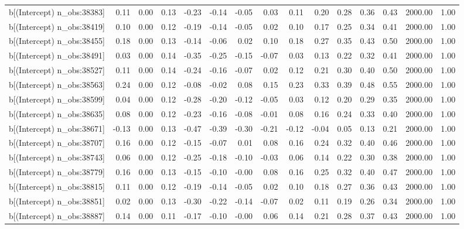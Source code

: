 \begin{table}[ht]
\begin{tabular}{rrrrrrrrrrrrrrr}
  b[(Intercept) n\_obs:38383] & 0.11 & 0.00 & 0.13 & -0.23 & -0.14 & -0.05 & 0.03 & 0.11 & 0.20 & 0.28 & 0.36 & 0.43 & 2000.00 & 1.00 \\ 
  b[(Intercept) n\_obs:38419] & 0.10 & 0.00 & 0.12 & -0.19 & -0.14 & -0.05 & 0.02 & 0.10 & 0.17 & 0.25 & 0.34 & 0.41 & 2000.00 & 1.00 \\ 
  b[(Intercept) n\_obs:38455] & 0.18 & 0.00 & 0.13 & -0.14 & -0.06 & 0.02 & 0.10 & 0.18 & 0.27 & 0.35 & 0.43 & 0.50 & 2000.00 & 1.00 \\ 
  b[(Intercept) n\_obs:38491] & 0.03 & 0.00 & 0.14 & -0.35 & -0.25 & -0.15 & -0.07 & 0.03 & 0.13 & 0.22 & 0.32 & 0.41 & 2000.00 & 1.00 \\ 
  b[(Intercept) n\_obs:38527] & 0.11 & 0.00 & 0.14 & -0.24 & -0.16 & -0.07 & 0.02 & 0.12 & 0.21 & 0.30 & 0.40 & 0.50 & 2000.00 & 1.00 \\ 
  b[(Intercept) n\_obs:38563] & 0.24 & 0.00 & 0.12 & -0.08 & -0.02 & 0.08 & 0.15 & 0.23 & 0.33 & 0.39 & 0.48 & 0.55 & 2000.00 & 1.00 \\ 
  b[(Intercept) n\_obs:38599] & 0.04 & 0.00 & 0.12 & -0.28 & -0.20 & -0.12 & -0.05 & 0.03 & 0.12 & 0.20 & 0.29 & 0.35 & 2000.00 & 1.00 \\ 
  b[(Intercept) n\_obs:38635] & 0.08 & 0.00 & 0.12 & -0.23 & -0.16 & -0.08 & -0.01 & 0.08 & 0.16 & 0.24 & 0.33 & 0.40 & 2000.00 & 1.00 \\ 
  b[(Intercept) n\_obs:38671] & -0.13 & 0.00 & 0.13 & -0.47 & -0.39 & -0.30 & -0.21 & -0.12 & -0.04 & 0.05 & 0.13 & 0.21 & 2000.00 & 1.00 \\ 
  b[(Intercept) n\_obs:38707] & 0.16 & 0.00 & 0.12 & -0.15 & -0.07 & 0.01 & 0.08 & 0.16 & 0.24 & 0.32 & 0.40 & 0.46 & 2000.00 & 1.00 \\ 
  b[(Intercept) n\_obs:38743] & 0.06 & 0.00 & 0.12 & -0.25 & -0.18 & -0.10 & -0.03 & 0.06 & 0.14 & 0.22 & 0.30 & 0.38 & 2000.00 & 1.00 \\ 
  b[(Intercept) n\_obs:38779] & 0.16 & 0.00 & 0.13 & -0.15 & -0.10 & -0.00 & 0.08 & 0.16 & 0.25 & 0.32 & 0.40 & 0.47 & 2000.00 & 1.00 \\ 
  b[(Intercept) n\_obs:38815] & 0.11 & 0.00 & 0.12 & -0.19 & -0.14 & -0.05 & 0.02 & 0.10 & 0.18 & 0.27 & 0.36 & 0.43 & 2000.00 & 1.00 \\ 
  b[(Intercept) n\_obs:38851] & 0.02 & 0.00 & 0.13 & -0.30 & -0.22 & -0.14 & -0.07 & 0.02 & 0.11 & 0.19 & 0.26 & 0.34 & 2000.00 & 1.00 \\ 
  b[(Intercept) n\_obs:38887] & 0.14 & 0.00 & 0.11 & -0.17 & -0.10 & -0.00 & 0.06 & 0.14 & 0.21 & 0.28 & 0.37 & 0.43 & 2000.00 & 1.00 \\ 

\end{tabular}
\end{table}
